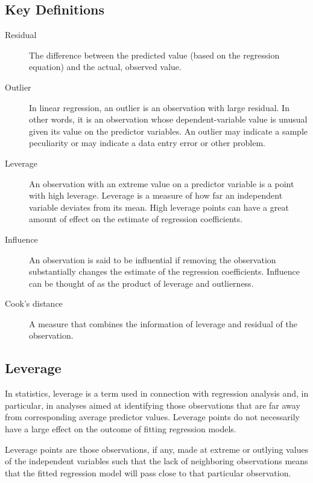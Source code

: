 \documentclass[12pt, a4paper]{article}
\begin{document}
\subsection{Key Definitions}
\begin{description}
	\item[ Residual] The difference between the predicted value (based on the regression equation) and the actual, observed value.
	
	\item[ Outlier] In linear regression, an outlier is an observation with large residual. In other words, it is an observation whose dependent-variable value is unusual given its value on the predictor variables. An outlier may indicate a sample peculiarity or may indicate a data entry error or other problem.
	
	\item[ Leverage] An observation with an extreme value on a predictor variable is a point with high leverage. Leverage is a measure of how far an independent variable deviates from its mean. High leverage points can have a great amount of effect on the estimate of regression coefficients.
	
	\item[ Influence] An observation is said to be influential if removing the observation substantially changes the estimate of the regression coefficients.  Influence can be thought of as the product of leverage and outlierness.
	
	\item[ Cook's distance ] A measure that combines the information of leverage and residual of the observation.
\end{description}


\subsection{Leverage}
In statistics, leverage is a term used in connection with regression analysis and, in particular, in analyses aimed at identifying those observations that are far away from corresponding average predictor values. Leverage points do not necessarily have a large effect on the outcome of fitting regression models.


Leverage points are those observations, if any, made at extreme or outlying values of the independent variables such that the lack of neighboring observations means that the fitted regression model will pass close to that particular observation.
\end{document}
